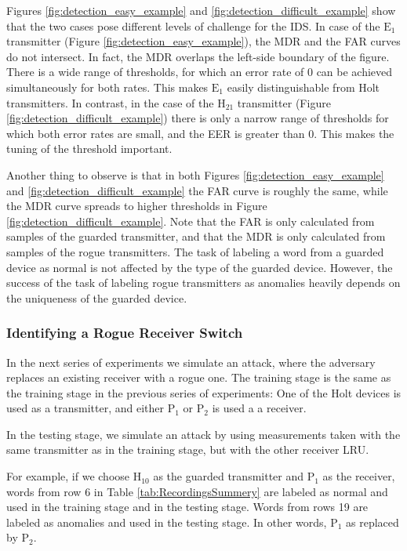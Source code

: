 \documentclass[compsoc,conference,a4paper]{IEEEtran}
\newcommand{\subsublevel}[1]{\subsubsection{#1}}
\newcommand{\subsublevel}[1]{\subsection{#1}}
\begin{document}
  Figures \ref{fig:detection_easy_example} and \ref{fig:detection_difficult_example} show that the two cases pose different levels of challenge for the IDS.
  In case of the \(\text{E}_1\) transmitter (Figure \ref{fig:detection_easy_example}), the MDR and the FAR curves do not intersect. In fact, the MDR overlaps the left-side boundary of the figure. There is a wide range of thresholds, for which an error rate of 0 can be achieved simultaneously for both rates. This makes \(\text{E}_1\) easily distinguishable from Holt transmitters. In contrast, in the case of the \(\text{H}_{21}\) transmitter (Figure \ref{fig:detection_difficult_example}) there is only a narrow range of thresholds for which both error rates are small, and the EER is greater than 0. This makes the tuning of the threshold important.
  
  Another thing to observe is that in both Figures \ref{fig:detection_easy_example} and \ref{fig:detection_difficult_example} the FAR curve is roughly the same, while the MDR curve spreads to higher thresholds in Figure \ref{fig:detection_difficult_example}. Note that the FAR is only calculated from samples of the guarded transmitter, and that the MDR is only calculated from samples of the rogue transmitters. The task of labeling a word from a guarded device as normal is not affected by the type of the guarded device. However, the success of the task of labeling rogue transmitters as anomalies heavily depends on the uniqueness of the guarded device.
  
\subsublevel{Identifying a Rogue Receiver Switch}
  In the next series of experiments we simulate an attack, where the adversary replaces an existing receiver with a rogue one. The training stage is the same as the training stage in the previous series of experiments: One of the Holt devices is used as a transmitter, and either \(\text{P}_1\) or \(\text{P}_2\) is used a a receiver.
  
  In the testing stage, we simulate an attack by using measurements taken with the same transmitter as in the training stage, but with the other receiver LRU.
  
  For example, if we choose \(\text{H}_{10}\) as the guarded transmitter and \(\text{P}_1\) as the receiver, words from row 6 in Table \ref{tab:RecordingsSummery} are labeled as normal and used in the training stage and in the testing stage. Words from rows 19 are labeled as anomalies and used in the testing stage. In other words, \(\text{P}_1\) as replaced by \(\text{P}_2\).
  
\end{document}
